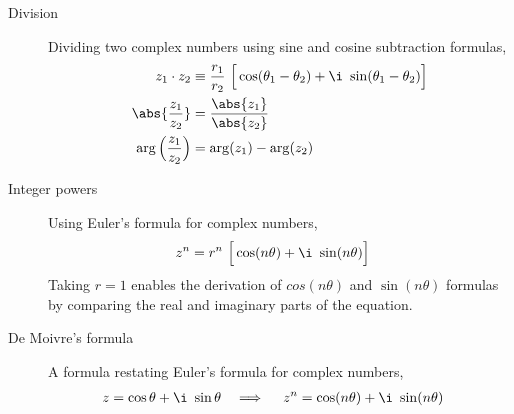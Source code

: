 \begin{description}
    \item[Division] Dividing two complex numbers using sine and cosine subtraction
        formulas,
        \begin{align}
            z_1 \cdot z_2                   & \equiv \frac{r_1}{r_2}
            \ \Big[\cos(\theta_1 - \theta_2) + \i\ \sin(\theta_1 - \theta_2) \Big] \\
            \abs{\frac{z_1}{z_2}}           & = \frac{\abs{z_1}}{\abs{z_2}}        \\
            \arg\Big( \frac{z_1}{z_2} \Big) & = \arg(z_1) - \arg(z_2)
        \end{align}

    \item[Integer powers] Using Euler's formula for complex numbers,
        \begin{align}
            z^n & = r^n\ \Big[\cos(n\theta) + \i\ \sin(n\theta)\Big]
        \end{align}
        Taking $ r = 1 $ enables the derivation of $ cos(n\theta) $ and $ \sin(n\theta) $
        formulas by comparing the real and imaginary parts of the equation.

    \item[De Moivre's formula] A formula restating Euler's formula for complex numbers,
        \begin{align}
            z                  & = \cos \theta + \i\ \sin\theta      &
            \implies \quad z^n & = \cos(n\theta) + \i\ \sin(n\theta)
        \end{align}


\end{description}
